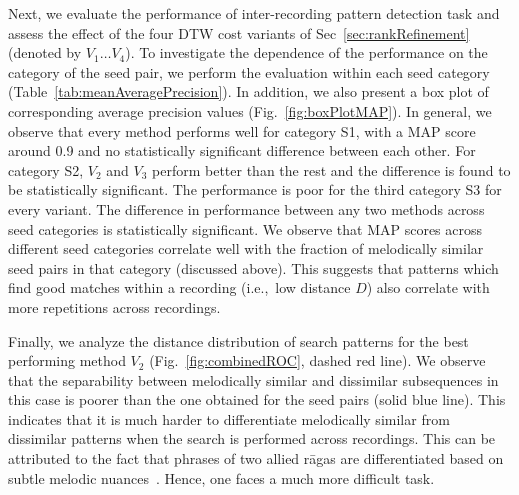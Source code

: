 
Next, we evaluate the performance of inter-recording pattern detection task and assess the effect of the four DTW cost variants of Sec~\ref{sec:rankRefinement} (denoted by $V_1 \dots V_4$). To investigate the dependence of  the performance on the category of the seed pair, we perform the evaluation within each seed category (Table~\ref{tab:meanAveragePrecision}). In addition, we also present a box plot of corresponding average precision values (Fig.~\ref{fig:boxPlotMAP}). In general, we observe that every method performs well for category S1, with a MAP score around 0.9 and no statistically significant difference between each other. For category S2, $V_2$ and $V_3$ perform better than the rest and the difference is found to be statistically significant. The performance is poor for the third category S3 for every variant. The difference in performance between any two methods across seed categories is statistically significant. We observe that MAP scores across different seed categories correlate well with the fraction of melodically similar seed pairs in that category (discussed above). This suggests that patterns which find good matches within a recording (i.e.,~low distance $D$) also correlate with more repetitions across recordings.

Finally, we analyze the distance distribution of search patterns for the best performing method $V_2$ (Fig.~\ref{fig:combinedROC}, dashed red line). We observe that the separability between melodically similar and dissimilar subsequences in this case is poorer than the one obtained for the seed pairs (solid blue line). This indicates that it is much harder to differentiate melodically similar from dissimilar patterns when the search is performed across recordings. This can be attributed to the fact that phrases of two allied r\={a}gas are differentiated based on subtle melodic nuances~\cite{Viswanathan2004}. Hence, one faces a much more difficult task. 

